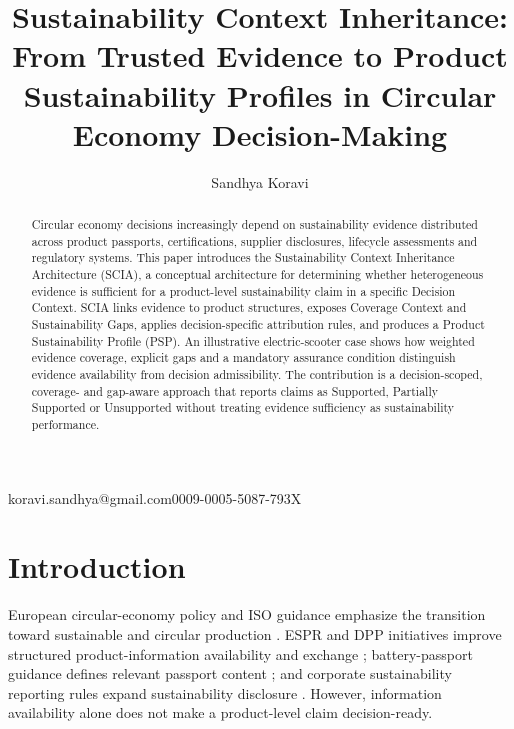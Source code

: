 \documentclass[english]{lni}
\begin{document}
\title{Sustainability Context Inheritance: From Trusted Evidence to Product Sustainability Profiles in Circular Economy Decision-Making}
\author[1]{Sandhya Koravi}{koravi.sandhya@gmail.com}{0009-0005-5087-793X}
\maketitle
\begin{abstract}
Circular economy decisions increasingly depend on sustainability evidence distributed across product passports, certifications, supplier disclosures, lifecycle assessments and regulatory systems. This paper introduces the Sustainability Context Inheritance Architecture (SCIA), a conceptual architecture for determining whether heterogeneous evidence is sufficient for a product-level sustainability claim in a specific Decision Context. SCIA links evidence to product structures, exposes Coverage Context and Sustainability Gaps, applies decision-specific attribution rules, and produces a Product Sustainability Profile (PSP). An illustrative electric-scooter case shows how weighted evidence coverage, explicit gaps and a mandatory assurance condition distinguish evidence availability from decision admissibility. The contribution is a decision-scoped, coverage- and gap-aware approach that reports claims as Supported, Partially Supported or Unsupported without treating evidence sufficiency as sustainability performance.
\end{abstract}

\section{Introduction}
European circular-economy policy and ISO guidance emphasize the transition toward sustainable and circular production \cite{EC20,IS24}. ESPR and DPP initiatives improve structured product-information availability and exchange \cite{EU24,CI24}; battery-passport guidance defines relevant passport content \cite{BP23}; and corporate sustainability reporting rules expand sustainability disclosure \cite{EU22}. However, information availability alone does not make a product-level claim decision-ready.
\end{document}
